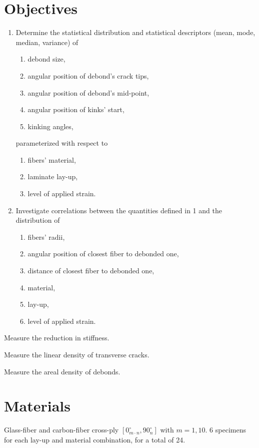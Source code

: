 \documentclass[review]{elsarticle}
\begin{document}
\section{Objectives}
\begin{enumerate}
\item Determine the statistical distribution and statistical descriptors (mean, mode, median, variance) of
\begin{enumerate}[label=\alph*]
\item debond size,
\item angular position of debond's crack tips,
\item angular position of debond's mid-point,
\item angular position of kinks' start,
\item kinking angles,
\end{enumerate}
parameterized with respect to
\begin{enumerate}[label=\alph*]
\item fibers' material,
\item laminate lay-up,
\item level of applied strain.
\end{enumerate}

\item Investigate correlations between the quantities defined in 1 and the distribution of
\begin{enumerate}[label=\alph*]
\item fibers' radii,
\item angular position of closest fiber to debonded one,
\item distance of closest fiber to debonded one,
\item material,
\item lay-up,
\item level of applied strain.
\end{enumerate}
\end{enumerate}

\item Measure the reduction in stiffness.
\item Measure the linear density of transverse cracks.
\item Measure the areal density of debonds.

\section{Materials}
Glass-fiber and carbon-fiber cross-ply $[0_{m\cdot n}^{\circ},90_{n}^{\circ}]$ with $m=1,10$. 6 specimens for each lay-up and material combination, for a total of 24.
\end{document}

